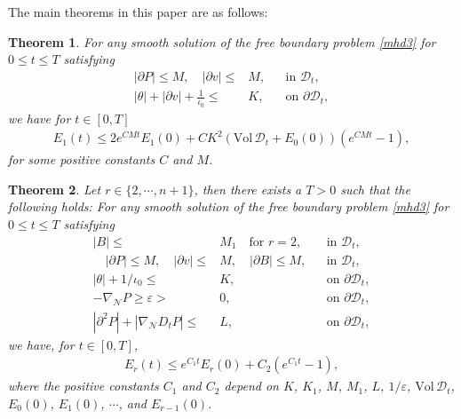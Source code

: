 \documentclass[12pt,reqno]{amsart}
\numberwithin{equation}{section}
\newtheorem{theorem}{Theorem}[section]
\theoremstyle{definition}
\theoremstyle{remark}
\begin{document}
The main theorems in this paper are as follows:
 \begin{theorem}\label{thm.1energy'}
  For any smooth solution of the free boundary problem \eqref{mhd3} for $0{\leqslant} t{\leqslant} T$ satisfying
  \begin{align}
    |{\partial} {P }|{\leqslant} M, \quad |{\partial} v|{\leqslant}& M,  &&\text{in } {{\mathscr{D}}}_t,\\
    |\theta|+|{\partial} v|+\frac{1}{\iota_0}{\leqslant} &K,&&\text{on }  {\partial}{{\mathscr{D}}}_t, \label{eq.1energy1.1}
  \end{align}
  we have for $t\in[0,T]$
  \begin{align}
    E_1(t){\leqslant} 2e^{CMt}E_1(0)+C K^2\left({\mathrm{Vol}\,}  {{\mathscr{D}}}_t + E_0(0)\right)\left(e^{CMt}-1\right),
  \end{align}
  for some positive constants $C$ and $M$.

\end{theorem}

\begin{theorem}\label{thm.renergy'}
  Let $r\in \{2,\cdots,n+1\}$, then there exists a $T>0$ such that the following holds: For any smooth solution of the free boundary problem \eqref{mhd3} for $0{\leqslant} t{\leqslant} T$ satisfying
  \begin{align}
   |B|{\leqslant}& M_1 \quad\text{for } r=2,&&\text{in } {{\mathscr{D}}}_t,\label{eq.2energy81'}\\
   \quad |{\partial} {P }|{\leqslant} M, \quad |{\partial} v|{\leqslant}& M, \quad |{\partial} B|{\leqslant} M,  &&\text{in } {{\mathscr{D}}}_t,\label{eq.2energy8'}\\
    |\theta|+1/\iota_0{\leqslant} &K,&&\text{on }  {\partial}{{\mathscr{D}}}_t,\label{eq.2energy9'}\\
    -{\nabla}_{\mathcal{N}} {P }{\geqslant} {\varepsilon}>&0, &&\text{on } {\partial}{{\mathscr{D}}}_t,\label{eq.2energy91'}\\
    |{\partial}^2{P }|+|{\nabla}_{\mathcal{N}} D_t{P }|{\leqslant}& L,&&\text{on } {\partial}{{\mathscr{D}}}_t,\label{eq.2energy92'}
  \end{align}
  we have, for $t\in[0,T]$,
  \begin{align}\label{eq.renergy'}
  E_r(t){\leqslant} e^{C_1t}E_r(0)+C_2\left(e^{C_1t}-1\right),
\end{align}
where the positive constants $C_1$ and $C_2$ depend on $K$, $K_1$, $M$, $M_1$, $L$, $1/{\varepsilon}$, ${\mathrm{Vol}\,} {{\mathscr{D}}}_t$, $E_0(0)$, $E_1(0)$, $\cdots$, and $E_{r-1}(0)$.
\end{theorem}
\end{document}

